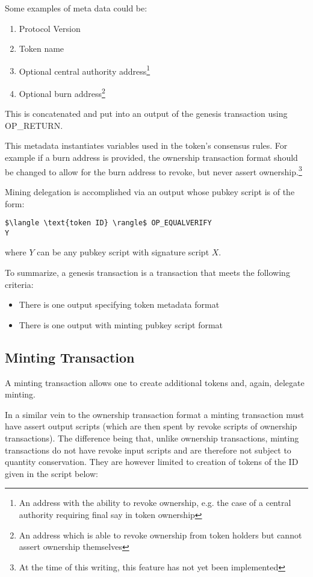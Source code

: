 \documentclass[9pt,oneside]{amsart}
\begin{document}
\begin{multicols}{2}
Some examples of meta data could be:
\begin{enumerate}
	\item Protocol Version
    \item Token name
	\item Optional central authority address\footnote{An address with the ability to revoke ownership, e.g. the case of a central authority requiring final say in token ownership}
    \item Optional burn address\footnote{An address which is able to revoke ownership from token holders but cannot assert ownership themselves}
\end{enumerate}
This is concatenated and put into an output of the genesis transaction using OP\_RETURN.

This metadata instantiates variables used in the token's consensus rules. For example if a burn address is provided, the ownership transaction format should be changed to allow for the burn address to revoke, but never assert ownership.\footnote{At the time of this writing, this feature has not yet been implemented}

Mining delegation is accomplished via an output whose pubkey script is of the form:

\begin{lstlisting}[title={\textbf{Minting PubKey Script}}]
$\langle \text{token ID} \rangle$ OP_EQUALVERIFY
Y
\end{lstlisting}
where $Y$ can be any pubkey script with signature script $X$. 

To summarize, a genesis transaction is a transaction that meets the following criteria:
\begin{itemize}
    \item There is one output specifying token metadata format
    \item There is one output with minting pubkey script format
\end{itemize}

\subsection{Minting Transaction}
A minting transaction allows one to create additional tokens and, again, delegate minting.

In a similar vein to the ownership transaction format a minting transaction must have assert output scripts (which are then spent by revoke scripts of ownership transactions). The difference being that, unlike ownership transactions, minting transactions do not have revoke input scripts and are therefore not subject to quantity conservation. They are however limited to creation of tokens of the ID given in the script below:


\end{multicols}
\end{document}
